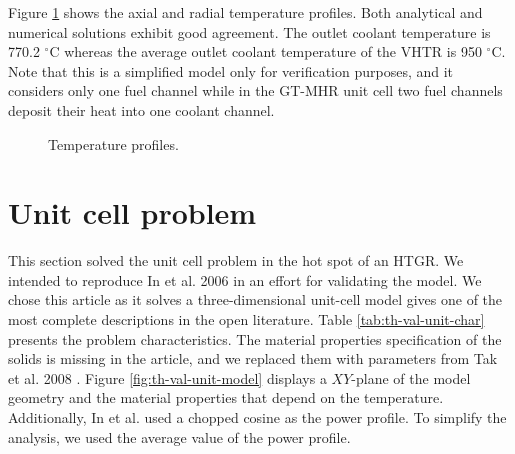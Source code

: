 Figure \ref{fig:th-ver-results} shows the axial and radial temperature profiles.
Both analytical and numerical solutions exhibit good agreement.
The outlet coolant temperature is 770.2 $^{\circ}$C whereas the average outlet coolant temperature of the VHTR is 950 $^{\circ}$C.
Note that this is a simplified model only for verification purposes, and it considers only one fuel channel while in the GT-MHR unit cell two fuel channels deposit their heat into one coolant channel.

\begin{figure}[htbp!]
	\centering
	\hfill
    \caption{Temperature profiles.}
	\label{fig:th-ver-results}
\end{figure}

\section{Unit cell problem}

This section solved the unit cell problem in the hot spot of an HTGR.
We intended to reproduce In et al. 2006 \cite{in_three-dimensional_2006} in an effort for validating the model.
We chose this article as it solves a three-dimensional unit-cell model gives one of the most complete descriptions in the open literature.
Table \ref{tab:th-val-unit-char} presents the problem characteristics.
The material properties specification of the solids is missing in the article, and we replaced them with parameters from Tak et al. 2008 \cite{tak_numerical_2008}.
Figure \ref{fig:th-val-unit-model} displays a $XY$-plane of the model geometry and the material properties that depend on the temperature.
Additionally, In et al. used a chopped cosine as the power profile.
To simplify the analysis, we used the average value of the power profile.

